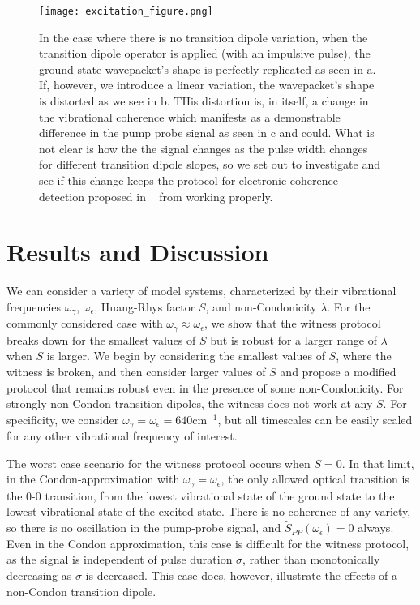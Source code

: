 \begin{figure}
   \texttt{[image: excitation\_figure.png]}
   \caption{In the case where there is no transition dipole variation, when the transition dipole operator is applied (with an impulsive pulse), the ground state wavepacket's shape is perfectly replicated as seen in a.  If, however, we introduce a linear variation, the wavepacket's shape is distorted as we see in b.  THis distortion is, in itself, a change in the vibrational coherence which manifests as a demonstrable difference in the pump probe signal as seen in c and could.  What is not clear is how the the signal changes as the pulse width changes for different transition dipole slopes, so we set out to investigate and see if this change keeps the protocol for electronic coherence detection proposed in ~\cite{witness,allanWitness} from working properly.  }
	\label{fig:physicalIllustration}
\end{figure}


\section{Results and Discussion}

We can consider a variety of model systems, characterized by their vibrational frequencies $\omega_{\gamma}$, $\omega_{\epsilon}$,  Huang-Rhys factor $S$, and non-Condonicity $\lambda$.  For the commonly considered case with $\omega_\gamma\approx\omega_\epsilon$, we show that the witness protocol breaks down for the smallest values of $S$ but is robust for a larger range of $\lambda$ when $S$ is larger. We begin by considering the smallest values of $S$, where the witness is broken, and then consider larger values of $S$ and propose a modified protocol that remains robust even in the presence of some non-Condonicity. For strongly non-Condon transition dipoles, the witness does not work at any $S$.  For specificity, we consider $\omega_{\gamma} = \omega_{\epsilon}= 640 \text{cm}^{-1}$, but all timescales can be easily scaled for any other vibrational frequency of interest.

The worst case scenario for the witness protocol occurs when $S=0$. In that limit, in the Condon-approximation with $\omega_{\gamma} = \omega_{\epsilon}$, the only allowed optical transition is the 0-0 transition, from the lowest vibrational state of the ground state to the lowest vibrational state of the excited state. There is no coherence of any variety, so there is no oscillation in the pump-probe signal, and $\tilde{S}_{PP}(\omega_\epsilon)=0$ always. Even in the Condon approximation, this case is difficult  for the witness protocol, as the signal is independent of pulse duration $\sigma$, rather than monotonically decreasing as $\sigma$ is decreased. This case does, however, illustrate the effects of a non-Condon transition dipole.

